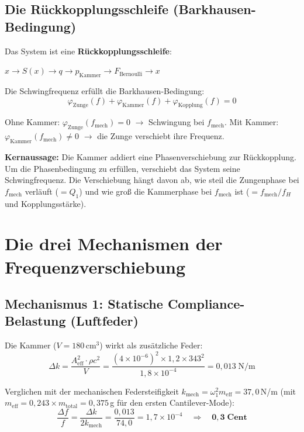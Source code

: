 \documentclass[11pt,a4paper]{article}
\begin{document}
\subsection{Die Rückkopplungsschleife (Barkhausen-Bedingung)}

Das System ist eine \textbf{Rückkopplungsschleife}:

\medskip
\centerline{$x \to S(x) \to q \to p_\text{Kammer} \to F_\text{Bernoulli} \to x$}
\medskip

Die Schwingfrequenz erfüllt die Barkhausen-Bedingung:
\begin{equation}
\varphi_\text{Zunge}(f) + \varphi_\text{Kammer}(f) + \varphi_\text{Kopplung}(f) = 0
\end{equation}

Ohne Kammer: $\varphi_\text{Zunge}(f_\text{mech}) = 0$ $\to$ Schwingung bei $f_\text{mech}$. Mit Kammer: $\varphi_\text{Kammer}(f_\text{mech}) \neq 0$ $\to$ die Zunge verschiebt ihre Frequenz.

\begin{keybox}
\textbf{Kernaussage:} Die Kammer addiert eine Phasenverschiebung zur Rückkopplung. Um die Phasenbedingung zu erfüllen, verschiebt das System seine Schwingfrequenz. Die Verschiebung hängt davon ab, wie steil die Zungenphase bei $f_\text{mech}$ verläuft ($= Q_1$) und wie groß die Kammerphase bei $f_\text{mech}$ ist ($= f_\text{mech}/f_H$ und Kopplungsstärke).
\end{keybox}

\section{Die drei Mechanismen der Frequenzverschiebung}

\subsection{Mechanismus 1: Statische Compliance-Belastung (Luftfeder)}

Die Kammer ($V = 180$\,cm$^3$) wirkt als zusätzliche Feder:
\begin{equation}
\Delta k = \frac{A_\text{eff}^2 \cdot \rho c^2}{V} = \frac{(4 \times 10^{-6})^2 \times 1{,}2 \times 343^2}{1{,}8 \times 10^{-4}} = 0{,}013\;\text{N/m}
\end{equation}

Verglichen mit der mechanischen Federsteifigkeit $k_\text{mech} = \omega_1^2 m_\text{eff} = 37{,}0$\,N/m (mit $m_\text{eff} = 0{,}243 \times m_\text{total} = 0{,}375$\,g für den ersten Cantilever-Mode):
\begin{equation}
\frac{\Delta f}{f} = \frac{\Delta k}{2 k_\text{mech}} = \frac{0{,}013}{74{,}0} = 1{,}7 \times 10^{-4} \quad \Rightarrow \quad \mathbf{0{,}3\;\text{Cent}}
\end{equation}
\end{document}
